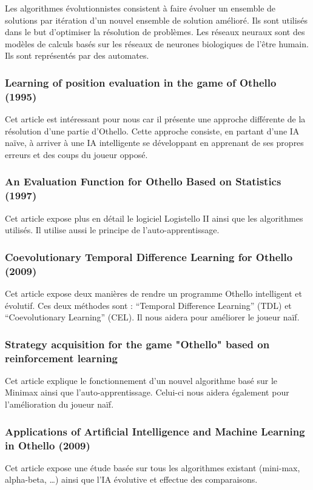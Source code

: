 \documentclass[a4paper,12pt]{article}
\begin{document}
Les algorithmes évolutionnistes consistent à faire évoluer un ensemble de solutions par itération d’un nouvel ensemble de solution amélioré. Ils sont utilisés dans le but d’optimiser la résolution de problèmes.
Les réseaux neuraux sont des modèles de calculs basés sur les réseaux de neurones biologiques de l’être humain. Ils sont représentés par des automates.



\subsubsection{Learning of position evaluation in the game of Othello (1995)}
Cet article \cite{b} est intéressant pour nous car il présente une approche
différente de la résolution d'une partie d'Othello. Cette approche
consiste, en partant d'une IA naïve, à arriver à une IA intelligente se
développant en apprenant de ses propres erreurs et des coups du joueur
opposé.

\subsubsection{An Evaluation Function for Othello Based on  Statistics (1997)}
Cet article \cite{c} expose plus en détail le logiciel Logistello II
ainsi que les algorithmes utilisés. Il utilise aussi le principe de
l'auto-apprentissage. 

\subsubsection{Coevolutionary Temporal Difference Learning for Othello (2009)}
Cet article \cite{d} expose deux manières de rendre un programme Othello intelligent et évolutif. Ces deux méthodes sont : “Temporal Difference Learning” (TDL) et “Coevolutionary Learning” (CEL).
Il nous aidera pour améliorer le joueur naïf.

\subsubsection{Strategy acquisition for the game "Othello" based on reinforcement learning}
Cet article \cite{e} explique le fonctionnement d'un nouvel algorithme basé sur le Minimax ainsi que l'auto-apprentissage. Celui-ci nous aidera également pour l'amélioration du joueur naïf.

\subsubsection{Applications of Artificial Intelligence and Machine Learning in Othello (2009)}
Cet article \cite{11} expose une étude basée sur tous les algorithmes
existant (mini-max, alpha-beta, …) ainsi que l'IA évolutive et
effectue des comparaisons.
\end{document}
